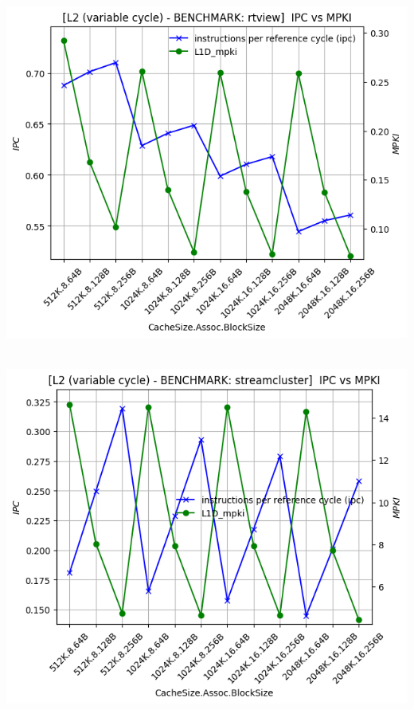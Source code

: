 \begin{minipage}{\textwidth}
    \begin{center}
        \\
        \vspace{3mm}
        \includegraphics[scale=0.65]{graphs/L2/var/rtview.png}
        \vspace{6mm}
    \end{center}
\end{minipage}

\begin{minipage}{\textwidth}
    \begin{center}
        \\
        \vspace{3mm}
        \includegraphics[scale=0.65]{graphs/L2/var/streamcluster.png}
        \vspace{6mm}
    \end{center}
\end{minipage}

